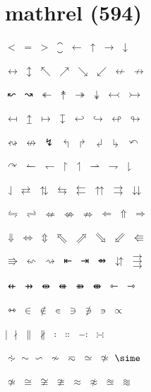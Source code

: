 \documentclass{article}
\begin{document}
\section*{mathrel (594)}

$\less$ $\equal$ $\greater$ $\closure$ $\leftarrow$ $\uparrow$ $\rightarrow$ $\downarrow$ \par
$\leftrightarrow$ $\updownarrow$ $\nwarrow$ $\nearrow$ $\searrow$ $\swarrow$ $\nleftarrow$ $\nrightarrow$ \par
$\leftwavearrow$ $\rightwavearrow$ $\twoheadleftarrow$ $\twoheaduparrow$ $\twoheadrightarrow$ $\twoheaddownarrow$ $\leftarrowtail$ $\rightarrowtail$ \par
$\mapsfrom$ $\mapsup$ $\mapsto$ $\mapsdown$ $\hookleftarrow$ $\hookrightarrow$ $\looparrowleft$ $\looparrowright$ \par
$\leftrightsquigarrow$ $\nleftrightarrow$ $\downzigzagarrow$ $\Lsh$ $\Rsh$ $\Ldsh$ $\Rdsh$ $\curvearrowleft$ \par
$\curvearrowright$ $\leftharpoonup$ $\leftharpoondown$ $\upharpoonright$ $\upharpoonleft$ $\rightharpoonup$ $\rightharpoondown$ $\downharpoonright$ \par
$\downharpoonleft$ $\rightleftarrows$ $\updownarrows$ $\leftrightarrows$ $\leftleftarrows$ $\upuparrows$ $\rightrightarrows$ $\downdownarrows$ \par
$\leftrightharpoons$ $\rightleftharpoons$ $\nLeftarrow$ $\nLeftrightarrow$ $\nRightarrow$ $\Leftarrow$ $\Uparrow$ $\Rightarrow$ \par
$\Downarrow$ $\Leftrightarrow$ $\Updownarrow$ $\Nwarrow$ $\Nearrow$ $\Searrow$ $\Swarrow$ $\Lleftarrow$ \par
$\Rrightarrow$ $\leftsquigarrow$ $\rightsquigarrow$ $\barleftarrow$ $\rightarrowbar$ $\circleonrightarrow$ $\downuparrows$ $\rightthreearrows$ \par
$\nvleftarrow$ $\nvrightarrow$ $\nvleftrightarrow$ $\nVleftarrow$ $\nVrightarrow$ $\nVleftrightarrow$ $\leftarrowtriangle$ $\rightarrowtriangle$ \par
$\leftrightarrowtriangle$ $\in$ $\notin$ $\smallin$ $\ni$ $\nni$ $\smallni$ $\propto$ \par
$\mid$ $\nmid$ $\parallel$ $\nparallel$ $\mathratio$ $\Colon$ $\dashcolon$ $\dotsminusdots$ \par
$\kernelcontraction$ $\sim$ $\backsim$ $\nsim$ $\eqsim$ $\simeq$ $\nsime$ $\sime$ \par
$\nsimeq$ $\cong$ $\simneqq$ $\ncong$ $\approx$ $\napprox$ $\approxeq$ $\approxident$ \par
\end{document}
